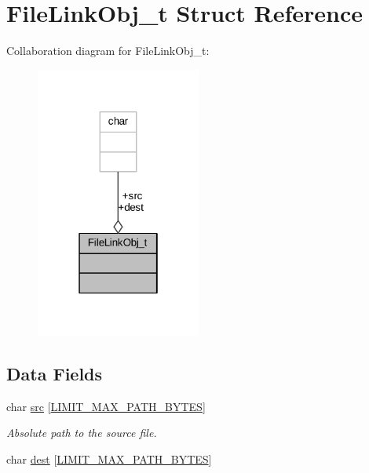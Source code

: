 \hypertarget{struct_file_link_obj__t}{}\section{File\+Link\+Obj\+\_\+t Struct Reference}
\label{struct_file_link_obj__t}


Collaboration diagram for File\+Link\+Obj\+\_\+t\+:
\nopagebreak
\begin{figure}[H]
\begin{center}
\leavevmode
\includegraphics[width=154pt]{struct_file_link_obj__t__coll__graph}
\end{center}
\end{figure}
\subsection*{Data Fields}
\begin{DoxyCompactItemize}
\item 
char \hyperlink{struct_file_link_obj__t_a01ff71979d6cc844716fe62688befc2f}{src} \mbox{[}\hyperlink{limit_8h_accd19a6264ef965c02f113dc01610e14}{L\+I\+M\+I\+T\+\_\+\+M\+A\+X\+\_\+\+P\+A\+T\+H\+\_\+\+B\+Y\+T\+ES}\mbox{]}
\begin{DoxyCompactList}\small\item\em Absolute path to the source file. \end{DoxyCompactList}\item 
char \hyperlink{struct_file_link_obj__t_a53bd7a777236c5bdb8240930aa28ebaf}{dest} \mbox{[}\hyperlink{limit_8h_accd19a6264ef965c02f113dc01610e14}{L\+I\+M\+I\+T\+\_\+\+M\+A\+X\+\_\+\+P\+A\+T\+H\+\_\+\+B\+Y\+T\+ES}\mbox{]}
\end{DoxyCompactItemize}


